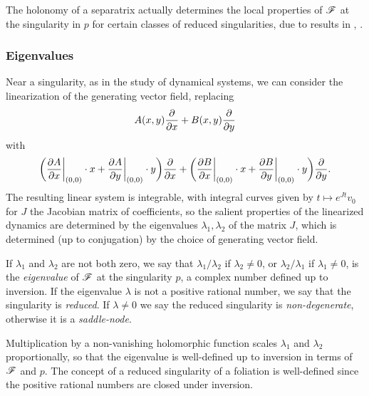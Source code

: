 The holonomy of a separatrix actually determines the local properties of $\mathscr{F}$
at the singularity in $p$ for certain classes of reduced singularities, due to
results in \cite{mattei_80}, \cite{martinet_82}.

\subsubsection{Eigenvalues}

Near a singularity, as in the study of dynamical systems, we can consider the
linearization of the generating vector field, replacing
\begin{equation*}
    A(x,y)\pdv{}{x} + B(x,y)\pdv{}{y}
\end{equation*}
with
\begin{equation*}
    \biggl(\pdv{A}{x}\bigg|_{(0,0)}\cdot x
        + \pdv{A}{y}\bigg|_{(0,0)}\cdot y\biggr)\pdv{}{x}
        + \biggl(\pdv{B}{x}\bigg|_{(0,0)}\cdot x
            +\pdv{B}{y}\bigg|_{(0,0)}\cdot y\biggr)\pdv{}{y}.
\end{equation*}
The resulting linear system is integrable, with integral curves given by
$t\mapsto e^{Jt}v_0$ for $J$ the Jacobian matrix of coefficients, so the salient
properties of the linearized dynamics are determined by the eigenvalues
$\lambda_1,\lambda_2$ of the matrix $J$, which is determined (up to conjugation)
by the choice of generating vector field.

\begin{definition}
    If $\lambda_1$ and $\lambda_2$ are not both zero, we say that
    $\lambda_1/\lambda_2$ if $\lambda_2\ne0$, or $\lambda_2/\lambda_1$ if
    $\lambda_1\ne0$, is the \emph{eigenvalue} of $\mathscr{F}$ at the singularity $p$,
    a complex number defined up to inversion. If the eigenvalue $\lambda$ is not
    a positive rational number, we say that the singularity is \emph{reduced}.
    If $\lambda\ne0$ we say the reduced singularity is \emph{non-degenerate},
    otherwise it is a \emph{saddle-node}.
\end{definition}

\begin{remark}
    Multiplication by a non-vanishing holomorphic function scales $\lambda_1$
    and $\lambda_2$ proportionally, so that the eigenvalue is well-defined up to
    inversion in terms of $\mathscr{F}$ and $p$. The concept of a reduced singularity
    of a foliation is well-defined since the positive rational numbers are
    closed under inversion.
\end{remark}

